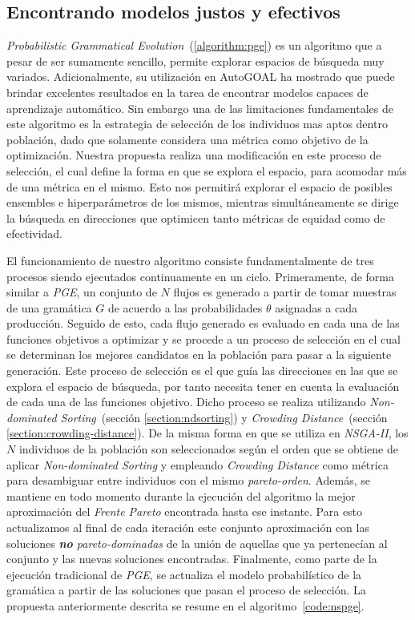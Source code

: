 \subsection{Encontrando modelos justos y efectivos}

\emph{Probabilistic Grammatical Evolution}~(\ref{algorithm:pge}) es un algoritmo que a pesar de ser sumamente sencillo, permite explorar espacios de búsqueda muy variados.
Adicionalmente, su utilización en AutoGOAL ha mostrado que puede brindar excelentes resultados en la tarea de encontrar modelos capaces de aprendizaje automático.
Sin embargo una de las limitaciones fundamentales de este algoritmo es la estrategia de selección de los individuos mas aptos dentro población, dado que solamente considera una métrica como objetivo de la optimización.
Nuestra propuesta realiza una modificación en este proceso de selección, el cual define la forma en que se explora el espacio, para acomodar más de una métrica en el mismo.
Esto nos permitirá explorar el espacio de posibles ensembles e hiperparámetros de los mismos, mientras simultáneamente se dirige la búsqueda en direcciones que optimicen tanto métricas de equidad como de efectividad.

El funcionamiento de nuestro algoritmo consiste fundamentalmente de tres procesos siendo ejecutados continuamente en un ciclo.
Primeramente, de forma similar a \emph{PGE}, un conjunto de $N$ flujos es generado a partir de tomar muestras de una gramática $G$ de acuerdo a las probabilidades $\theta$ asignadas a cada producción.
Seguido de esto, cada flujo generado es evaluado en cada una de las funciones objetivos a optimizar y se procede a un proceso de selección en el cual se determinan los mejores candidatos en la población para pasar a la siguiente generación.
Este proceso de selección es el que guía las direcciones en las que se explora el espacio de búsqueda, por tanto necesita tener en cuenta la evaluación de cada una de las funciones objetivo.
Dicho proceso se realiza utilizando \emph{Non-dominated Sorting}~(sección \ref{section:ndsorting}) y \emph{Crowding Distance}~(sección \ref{section:crowding-distance}).
De la misma forma en que se utiliza en \emph{NSGA-II}, los $N$ individuos de la población son seleccionados según el orden que se obtiene de aplicar \emph{Non-dominated Sorting} y empleando \emph{Crowding Distance} como métrica para desambiguar entre individuos con el mismo \emph{pareto-orden}.
Además, se mantiene en todo momento durante la ejecución del algoritmo la mejor aproximación del \emph{Frente Pareto} encontrada hasta ese instante.
Para esto actualizamos al final de cada iteración este conjunto aproximación con las soluciones \emph{\textbf{no} pareto-dominadas} de la unión de aquellas que ya pertenecían al conjunto y las nuevas soluciones encontradas.
Finalmente, como parte de la ejecución tradicional de \emph{PGE}, se actualiza el modelo probabilístico de la gramática a partir de las soluciones que pasan el proceso de selección.
La propuesta anteriormente descrita se resume en el algoritmo~\ref{code:nspge}.

